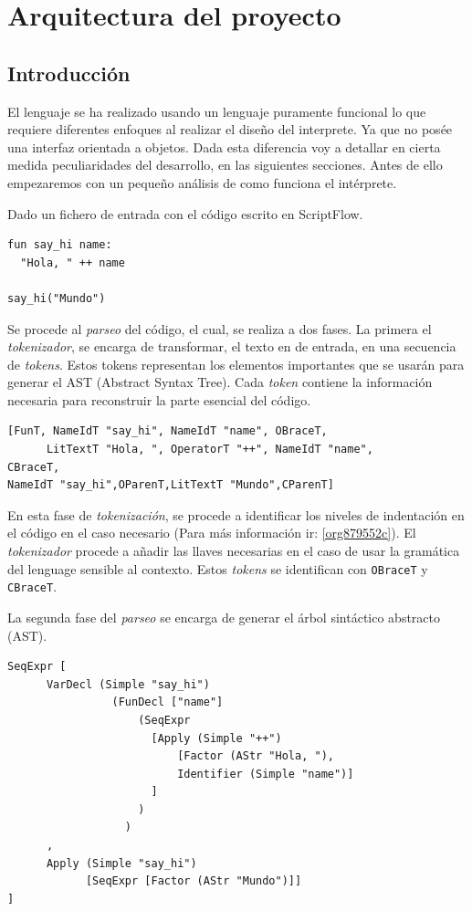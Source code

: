 \documentclass[11pt]{article}
\begin{document}
\section{Arquitectura del proyecto}
\label{sec:orgece86cb}

\subsection{Introducción}
\label{sec:orge54af89}

El lenguaje se ha realizado usando un lenguaje puramente funcional lo que
requiere diferentes enfoques al realizar el diseño del interprete. Ya que
no posée una interfaz orientada a objetos. Dada esta diferencia voy a
detallar en cierta medida peculiaridades del desarrollo, en las siguientes
secciones. Antes de ello empezaremos con un pequeño análisis de como
funciona el intérprete.

Dado un fichero de entrada con el código escrito en ScriptFlow.

\begin{verbatim}
fun say_hi name:
  "Hola, " ++ name

say_hi("Mundo")
\end{verbatim}


Se procede al \emph{parseo} del código, el cual, se realiza a dos fases. La primera el
\emph{tokenizador}, se encarga de transformar, el texto en de entrada, en una
secuencia de \emph{tokens}. Estos tokens representan los elementos importantes
que se usarán para generar el AST (Abstract Syntax Tree). Cada \emph{token} contiene la información
necesaria para reconstruir la parte esencial del código.

\begin{verbatim}
[FunT, NameIdT "say_hi", NameIdT "name", OBraceT,
      LitTextT "Hola, ", OperatorT "++", NameIdT "name",
CBraceT,
NameIdT "say_hi",OParenT,LitTextT "Mundo",CParenT]
\end{verbatim}

En esta fase de \emph{tokenización}, se procede a identificar los niveles de
indentación en el código en el caso necesario (Para más información ir: \ref{org879552c}).
El \emph{tokenizador} procede a añadir las llaves necesarias en el caso de usar la
gramática del lenguage sensible al contexto. Estos \emph{tokens} se identifican con
\texttt{OBraceT} y \texttt{CBraceT}.

La segunda fase del \emph{parseo} se encarga de generar el árbol sintáctico
abstracto (AST).

\begin{verbatim}
SeqExpr [
      VarDecl (Simple "say_hi")
                (FunDecl ["name"]
                    (SeqExpr
                      [Apply (Simple "++")
                          [Factor (AStr "Hola, "),
                          Identifier (Simple "name")]
                      ]
                    )
                  )
      ,
      Apply (Simple "say_hi")
            [SeqExpr [Factor (AStr "Mundo")]]
]
\end{verbatim}
\end{document}
